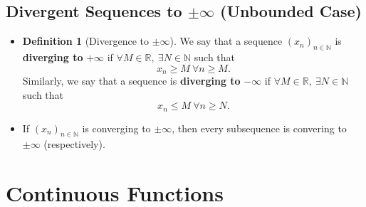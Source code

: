 \documentclass{article}
\newcommand{\R}{\mathbb{R}}
\newcommand{\N}{\mathbb{N}}
\newcommand{\seq}[2]{(#1_{#2})_{#2 \in \N}}
\newcommand{\?}{\stackrel{?}{=}}
\theoremstyle{definition} %
\newtheorem{definition}[theorem]{Definition} %
\begin{document}
\subsection{Divergent Sequences to $\pm \infty$ (Unbounded Case)}

\begin{itemize}
    \item[]
          \begin{definition}[Divergence to $\pm \infty$]
              We say that a sequence $\seq{x}{n}$ is \textbf{diverging to} $+\infty$ if $\forall M \in \R, \ \exists N \in \N$ such that
              $$x_n \geq M \ \forall n \geq M.$$
              Similarly, we say that a sequence is \textbf{diverging to} $-\infty$ if $\forall M \in \R, \ \exists N \in \N$ such that
              $$x_n \leq M \ \forall n \geq N.$$
          \end{definition}
    \item[]
          \begin{lemma}
              If $\seq{x}{n}$ is converging to $\pm \infty$, then every subsequence is convering to $\pm \infty$ (respectively).
          \end{lemma}
\end{itemize}

\section{Continuous Functions}
\end{document}
